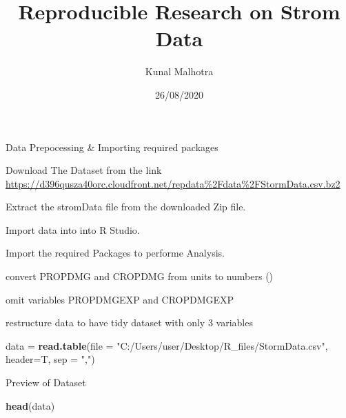 \documentclass[
]{article}
\title{Reproducible Research on Strom Data}
\author{Kunal Malhotra}
\date{26/08/2020}
\newenvironment{Shaded}{\begin{snugshade}}{\end{snugshade}}
\newcommand{\DataTypeTok}[1]{\textcolor[rgb]{0.13,0.29,0.53}{#1}}
\newcommand{\KeywordTok}[1]{\textcolor[rgb]{0.13,0.29,0.53}{\textbf{#1}}}
\newcommand{\NormalTok}[1]{#1}
\newcommand{\StringTok}[1]{\textcolor[rgb]{0.31,0.60,0.02}{#1}}
\begin{document}
\maketitle

Data Prepocessing \& Importing required packages

Download The Dataset from the link
\url{https://d396qusza40orc.cloudfront.net/repdata\%2Fdata\%2FStormData.csv.bz2}

Extract the stromData file from the downloaded Zip file.

Import data into into R Studio.

Import the required Packages to performe Analysis.

convert PROPDMG and CROPDMG from units to numbers ()

omit variables PROPDMGEXP and CROPDMGEXP

restructure data to have tidy dataset with only 3 variables

\begin{Shaded}
\begin{Highlighting}[]
\NormalTok{data =}\StringTok{ }\KeywordTok{read.table}\NormalTok{(}\DataTypeTok{file =} \StringTok{"C:/Users/user/Desktop/R_files/StormData.csv"}\NormalTok{, }\DataTypeTok{header=}\NormalTok{T, }\DataTypeTok{sep =} \StringTok{","}\NormalTok{)}
\end{Highlighting}
\end{Shaded}

Preview of Dataset

\begin{Shaded}
\begin{Highlighting}[]
\KeywordTok{head}\NormalTok{(data)}
\end{Highlighting}
\end{Shaded}
\end{document}
